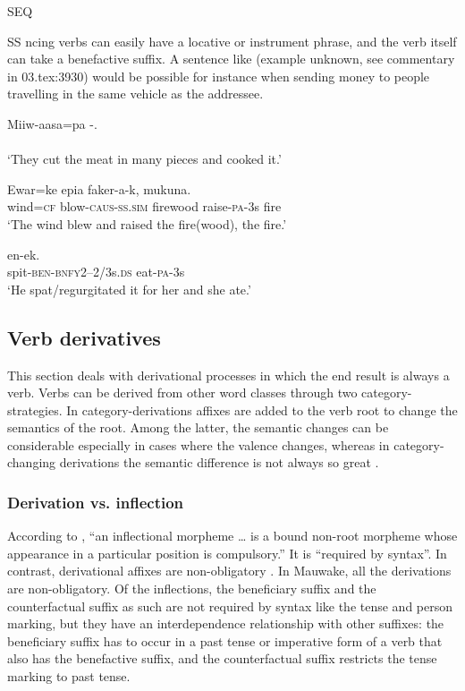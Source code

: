 SEQ 
 
\textsc{SS}
 ncing verbs can easily have a locative or instrument phrase, and the verb itself can take a benefactive suffix. A sentence like (example unknown, see commentary in 03.tex:3930) 
 would be possible for instance when sending money to people travelling in the same vehicle as the addressee. 

\ea%
\label{ex:3:x338}
\gll Miiw-aasa=pa -. \\ \\
\glt`They cut the meat in many pieces and cooked it.'
\z

\ea%
\label{ex:3:x186}
\gll Ewar=ke  epia faker-a-k, mukuna. \\
wind=\textsc{cf} blow-\textsc{caus}-\textsc{ss}.\textsc{sim} firewood raise-\textsc{pa}-3s fire \\
\glt`The wind blew and raised the fire(wood), the fire.' 
\z

\ea%
\label{ex:3:x187}
\gll {} en-ek. \\
spit-\textsc{ben}-\textsc{bnfy}2--2/3s.\textsc{ds} eat-\textsc{pa}-3s \\
\glt`He spat/regurgitated it for her and she ate.'
\z

\subsection{Verb derivatives}\label{sec:3.8.2}
{}
This section deals with derivational processes in which the end result is always a verb. Verbs can be derived from other word classes through two category- strategies. In category-derivations affixes are added to the verb root to change the semantics of the root. Among the latter, the semantic changes can be considerable especially in cases where the valence changes, whereas in category-changing derivations the semantic difference is not always so great \citep[83]{Bybee1985}. 

\subsubsection{Derivation vs. inflection}\label{sec:3:z:y:x}
{}
According to \citet[81]{Bybee1985}, ``{an inflectional morpheme {\dots} is a bound non-root morpheme whose appearance in a particular position is compulsory}.'' It is ``{required by syntax}''. In contrast, derivational affixes are non-obligatory \citep[191]{Greenberg1954}. In Mauwake, all the derivations are non-obligatory. Of the inflections, the beneficiary suffix and the counterfactual suffix as such are not required by syntax like the tense and person marking, but they have an interdependence relationship with other suffixes: the beneficiary suffix has to occur in a past tense or imperative form of a verb that also has the benefactive suffix, and the counterfactual suffix restricts the tense marking to past tense.


